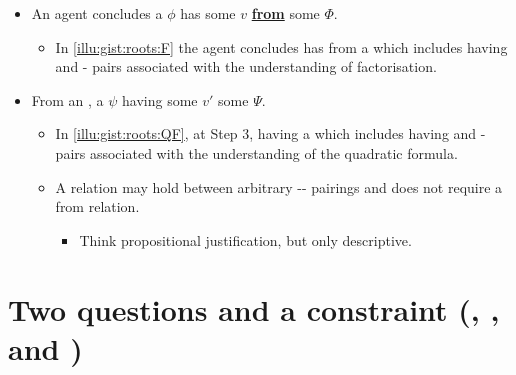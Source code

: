 \documentclass[10pt]{article}
\newcommand{\hand}{\ding{43}}
\begin{document}
\begin{note}
  \begin{itemize}
  \item
    An agent concludes a  \(\phi\) has some  \(v\) \underline{\textbf{from}} some \pool{} \(\Phi\).
    \begin{itemize}
    \item
      In \autoref{illu:gist:roots:F} the agent concludes \propI{\rootsCon{}} has \val{}  from a \pool{} which includes \propM{\rootsConEq{}} having   and - pairs associated with the \agents{} understanding of factorisation.
    \end{itemize}
  \item
    From an \agpe{}, a  \(\psi\) having some  \(v'\) \underline{\textbf{\fof{}}} some \pool{} \(\Psi\).
    \begin{itemize}
    \item
      In \autoref{illu:gist:roots:QF}, at Step 3, \propI{\rootsCon{}} having \val{}  \fof{} a \pool{} which includes \propM{\rootsConEq{}} having   and - pairs associated with the \agents{} understanding of the quadratic formula.
    \end{itemize}
    \begin{itemize}
    \item[\hand]
      A \fof{} relation may hold between arbitrary -- pairings and does not require a from relation.
      \begin{itemize}
      \item
        Think propositional justification, but only descriptive.
      \end{itemize}
    \end{itemize}
  \end{itemize}

\end{note}

\section{Two questions and a constraint \hfill (\qWhy{}, \qHow{}, and \issueInclusion{})}
\label{sec:target}

\vfill
\end{document}

